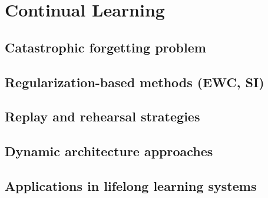 \section{Continual Learning}
\subsection{Catastrophic forgetting problem}
\subsection{Regularization-based methods (EWC, SI)}
\subsection{Replay and rehearsal strategies}
\subsection{Dynamic architecture approaches}
\subsection{Applications in lifelong learning systems}


